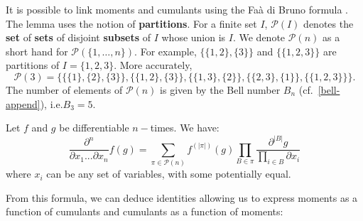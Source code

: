 It is possible to link moments and cumulants using the Faà di Bruno formula \cite{livre_faa, wiki-faa}. The lemma uses the notion of \textbf{partitions}. For a finite set $I$, $\mathcal{P}(I)$ denotes the \textbf{set} of \textbf{sets} of disjoint \textbf{subsets} of $I$ whose union is $I$. We denote $\mathcal{P}(n)$ as a short hand for $\mathcal{P}(\{1, \ldots, n\})$. For example, $\Big\{\{1, 2\}, \{3\}\Big\}$ and $\Big\{\{1, 2, 3\}\Big\}$ are partitions of $I = \{1, 2, 3\}$. More accurately, 
$$\mathcal{P}(3) = \Bigg\{\Big\{\{1\}, \{2\}, \{3\}\Big\}, \Big\{\{1, 2\}, \{3\}\Big\}, \Big\{\{1, 3\}, \{2\}\Big\}, \Big\{\{2, 3\}, \{1\}\Big\}, \Big\{\{1, 2, 3\}\Big\}\Bigg\}.$$ 
The number of elements of $\mathcal{P}(n)$ is given by the Bell number $B_n$ (cf.\@~\autoref{bell-append}), i.e.\@ $B_3 = 5$.

\begin{lemma} 
    Let $f$ and $g$ be differentiable $n-$times. We have:
    \begin{equation} \label{faa_form}
        \frac{\partial^n}{\partial x_1 ... \partial x_n} f(g) = \sum_{\pi \in \mathcal{P}(n)} f^{(|\pi|)}(g) \prod_{B \in \pi} \frac{\partial^{|B|} g}{\prod_{i \in B} \partial x_i}
    \end{equation}
    where $x_i$ can be any set of variables, with some potentially equal.
\end{lemma}

From this formula, we can deduce identities allowing us to express moments as a function of cumulants and cumulants as a function of moments:

